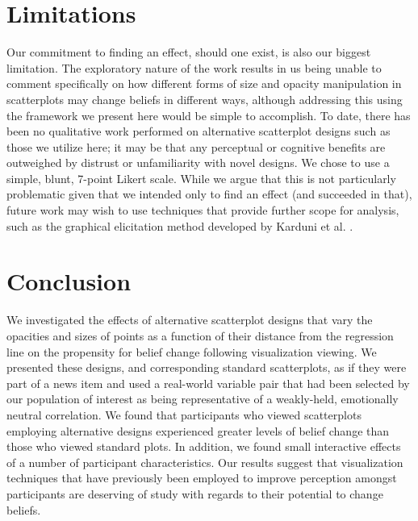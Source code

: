 \documentclass[manuscript,screen,review,anonymous]{acmart}
\begin{document}
\section{Limitations}\label{sec-limitations}

Our commitment to finding an effect, should one exist, is also our
biggest limitation. The exploratory nature of the work results in us
being unable to comment specifically on how different forms of size and
opacity manipulation in scatterplots may change beliefs in different
ways, although addressing this using the framework we present here would
be simple to accomplish. To date, there has been no qualitative work
performed on alternative scatterplot designs such as those we utilize
here; it may be that any perceptual or cognitive benefits are outweighed
by distrust or unfamiliarity with novel designs. We chose to use a
simple, blunt, 7-point Likert scale. While we argue that this is not
particularly problematic given that we intended only to find an effect
(and succeeded in that), future work may wish to use techniques that
provide further scope for analysis, such as the graphical elicitation
method developed by Karduni et al. \citep{karduni_2020, karduni_2023}.

\section{Conclusion}\label{sec-conclusion}

We investigated the effects of alternative scatterplot designs that vary
the opacities and sizes of points as a function of their distance from
the regression line on the propensity for belief change following
visualization viewing. We presented these designs, and corresponding
standard scatterplots, as if they were part of a news item and used a
real-world variable pair that had been selected by our population of
interest as being representative of a weakly-held, emotionally neutral
correlation. We found that participants who viewed scatterplots
employing alternative designs experienced greater levels of belief
change than those who viewed standard plots. In addition, we found small
interactive effects of a number of participant characteristics. Our
results suggest that visualization techniques that have previously been
employed to improve perception amongst participants are deserving of
study with regards to their potential to change beliefs.




\end{document}
